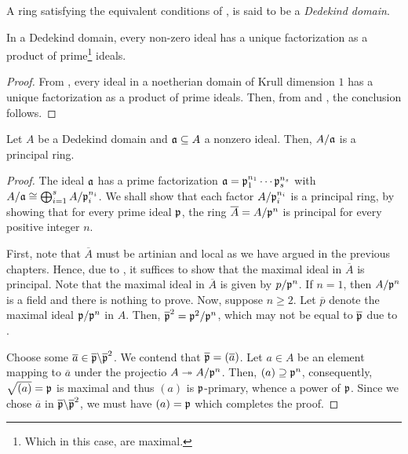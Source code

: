 \begin{definition}
    A ring satisfying the equivalent conditions of , is said to be a \emph{Dedekind domain}.
\end{definition}

\begin{theorem}
    In a Dedekind domain, every non-zero ideal has a unique factorization as a product of prime\footnote{Which in this case, are maximal.} ideals.
\end{theorem}
\begin{proof}
    From , every ideal in a noetherian domain of Krull dimension $1$ has a unique factorization as a product of prime ideals. Then, from  and , the conclusion follows.
\end{proof}

\begin{proposition}
    Let $A$ be a Dedekind domain and $\mathfrak a\subseteq A$ a nonzero ideal. Then, $A/\mathfrak a$ is a principal ring.
\end{proposition}
\begin{proof}
    The ideal $\mathfrak a$ has a prime factorization $\mathfrak a = \mathfrak p_1^{n_1}\cdots\mathfrak p_s^{n_s}$ with $A/\mathfrak a\cong\bigoplus_{i = 1}^s A/\mathfrak p_i^{n_i}$. We shall show that each factor $A/\mathfrak p_i^{n_i}$ is a principal ring, by showing that for every prime ideal $\mathfrak p$, the ring $\overline A = A/\mathfrak p^n$ is principal for every positive integer $n$.

    First, note that $\overline A$ must be artinian and local as we have argued in the previous chapters. Hence, due to , it suffices to show that the maximal ideal in $\overline A$ is principal. Note that the maximal ideal in $\overline A$ is given by $p/\mathfrak p^n$. If $n = 1$, then $A/\mathfrak p^n$ is a field and there is nothing to prove. Now, suppose $n\ge 2$. Let $\overline p$ denote the maximal ideal $\mathfrak p/\mathfrak p^n$ in $A$. Then, $\overline{\mathfrak p}^2 = \mathfrak p^2/\mathfrak p^n$, which may not be equal to $\overline{\mathfrak p}$ due to .

    Choose some $\overline a\in\overline{\mathfrak p}\backslash\overline{\mathfrak p}^2$. We contend that $\overline{\mathfrak p} = (\overline a)$. Let $a\in A$ be an element mapping to $\overline a$ under the projectio $A\twoheadrightarrow A/\mathfrak p^n$. Then, $(a)\supseteq\mathfrak p^n$, consequently, $\sqrt{(a)} = \mathfrak p$ is maximal and thus $(a)$ is $\mathfrak p$-primary, whence a power of $\mathfrak p$. Since we chose $\overline{a}$ in $\overline{\mathfrak p}\backslash\overline{\mathfrak p}^2$, we must have $(a) = \mathfrak p$ which completes the proof.
\end{proof}

